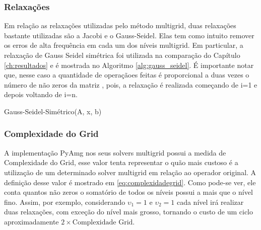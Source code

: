 \subsubsection{Relaxações}


Em relação as relaxações utilizadas pelo método multigrid, duas relaxações bastante utilizadas são a Jacobi e o Gauss-Seidel. Elas tem como intuito remover os erros de alta frequência em cada um dos níveis multigrid. Em particular, a relaxação de Gauss Seidel simétrica foi utilizada na comparação do Capítulo \ref{ch:resultados} e é mostrada no Algoritmo \ref{alg:gauss_seidel}. É importante notar que, nesse caso a quantidade de operaçãoes feitas é proporcional a duas vezes o número de não zeros da matriz , pois, a relaxação é realizada começando de i=1 e depois voltando de i=n.

\vspace{1cm}

\begin{algorithm}[H]
\caption{Gauss-Seidel-Simétrico(A, x, b)}
\label{alg:gauss_seidel}
\end{algorithm}

\vspace{1cm}


\subsubsection{Complexidade do Grid}
 
A implementação PyAmg nos seus solvers multigrid possui a medida de Complexidade do Grid, esse valor tenta representar o quão mais custoso é a utilização de um determinado solver multigrid em relação ao operador original. A definição desse valor é mostrado em \eqref{eq:complexidadegrid}. Como pode-se ver, ele conta quantos não zeros o somatório de todos os níveis possui a mais que o nível fino. Assim, por exemplo, considerando $\upsilon_1=1$ e $\upsilon_2=1$ cada nível irá realizar duas relaxações, com exceção do nível mais grosso, tornando o  custo de um ciclo aproximadamente $2\times\text{Complexidade Grid}$. 

